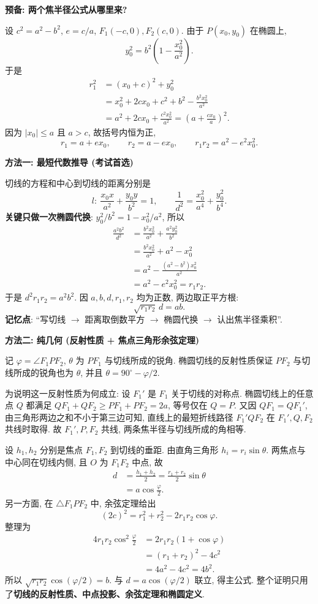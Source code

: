 \begin{proofbox}
\textbf{预备: 两个焦半径公式从哪里来?}

设 $c^2=a^2-b^2$, $e=c/a$, $F_1(-c,0),F_2(c,0)$.
由于 $P(x_0,y_0)$ 在椭圆上,
\[
y_0^2=b^2\left(1-\frac{x_0^2}{a^2}\right).
\]
于是
\[
\begin{aligned}
r_1^2&=(x_0+c)^2+y_0^2\\
&=x_0^2+2cx_0+c^2+b^2-\frac{b^2x_0^2}{a^2}\\
&=a^2+2cx_0+\frac{c^2x_0^2}{a^2}
=\left(a+\frac{cx_0}{a}\right)^2.
\end{aligned}
\]
因为 $|x_0|\le a$ 且 $a>c$, 故括号内恒为正,
\[
\boxed{r_1=a+ex_0},\qquad \boxed{r_2=a-ex_0},
\qquad\boxed{r_1r_2=a^2-e^2x_0^2}.
\]

\textbf{方法一: 最短代数推导 (考试首选)}

切线的方程和中心到切线的距离分别是
\[
l:\ \frac{x_0x}{a^2}+\frac{y_0y}{b^2}=1,
\qquad
\frac1{d^2}=\frac{x_0^2}{a^4}+\frac{y_0^2}{b^4}.
\]
\textbf{关键只做一次椭圆代换}: $y_0^2/b^2=1-x_0^2/a^2$, 所以
\[
\begin{aligned}
\frac{a^2b^2}{d^2}
&=\frac{b^2x_0^2}{a^2}+\frac{a^2y_0^2}{b^2}\\
&=\frac{b^2x_0^2}{a^2}+a^2-x_0^2\\
&=a^2-\frac{(a^2-b^2)x_0^2}{a^2}\\
&=a^2-e^2x_0^2=r_1r_2.
\end{aligned}
\]
于是 $d^2r_1r_2=a^2b^2$.
因 $a,b,d,r_1,r_2$ 均为正数, 两边取正平方根:
\[
\boxed{\sqrt{r_1r_2}\,d=ab}.
\]
\textbf{记忆点}: ``写切线 $\to$ 距离取倒数平方 $\to$ 椭圆代换 $\to$ 认出焦半径乘积''.

\medskip
\textbf{方法二: 纯几何 (反射性质 + 焦点三角形余弦定理)}

记 $\varphi=\angle F_1PF_2$, $\theta$ 为 $PF_1$ 与切线所成的锐角.
椭圆切线的反射性质保证 $PF_2$ 与切线所成的锐角也为 $\theta$,
并且 $\theta=90^\circ-\varphi/2$.

为说明这一反射性质为何成立: 设 $F_1'$ 是 $F_1$ 关于切线的对称点.
椭圆切线上的任意点 $Q$ 都满足
$QF_1+QF_2\ge PF_1+PF_2=2a$, 等号仅在 $Q=P$.
又因 $QF_1=QF_1'$, 由三角形两边之和不小于第三边可知,
直线上的最短折线路径 $F_1'QF_2$ 在 $F_1',Q,F_2$ 共线时取得.
故 $F_1',P,F_2$ 共线, 两条焦半径与切线所成的角相等.

设 $h_1,h_2$ 分别是焦点 $F_1,F_2$ 到切线的垂距.
由直角三角形 $h_i=r_i\sin\theta$.
两焦点与中心同在切线内侧, 且 $O$ 为 $F_1F_2$ 中点, 故
\[
\begin{aligned}
d&=\frac{h_1+h_2}{2}
=\frac{r_1+r_2}{2}\sin\theta\\
&=a\cos\frac\varphi2.
\end{aligned}
\]
另一方面, 在 $\triangle F_1PF_2$ 中, 余弦定理给出
\[
(2c)^2=r_1^2+r_2^2-2r_1r_2\cos\varphi.
\]
整理为
\[
\begin{aligned}
4r_1r_2\cos^2\frac\varphi2
&=2r_1r_2(1+\cos\varphi)\\
&=(r_1+r_2)^2-4c^2\\
&=4a^2-4c^2=4b^2.
\end{aligned}
\]
所以 $\sqrt{r_1r_2}\cos(\varphi/2)=b$.
与 $d=a\cos(\varphi/2)$ 联立, 得主公式.
整个证明只用了\textbf{切线的反射性质、中点投影、余弦定理和椭圆定义}.


\end{proofbox}
